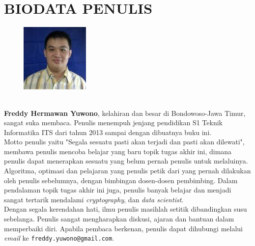 \chapter{BIODATA PENULIS}
		\begin{figure}
			\includegraphics[width=0.3\textwidth]{images/foto-diri.jpg}
		\end{figure}
		\textbf{\ \\Freddy Hermawan Yuwono}, kelahiran dan besar di Bondowoso-Jawa Timur, sangat suka membaca. Penulis menempuh jenjang pendidikan S1 Teknik Informatika ITS dari tahun 2013 sampai dengan dibuatnya buku ini.\\
		
		\indent Motto penulis yaitu "Segala sesuatu pasti akan terjadi dan pasti akan dilewati", membawa penulis mencoba belajar yang baru topik tugas akhir ini, dimana penulis dapat menerapkan sesuatu yang belum pernah penulis untuk melaluinya. Algoritma, optimasi dan pelajaran yang penulis petik dari yang pernah dilakukan oleh penulis sebelumnya, dengan bimbingan dosen-dosen pembimbing. Dalam pendalaman topik tugas akhir ini juga, penulis banyak belajar dan menjadi sangat tertarik mendalami \textit{cryptography}, dan \textit{data scientist}. \\
		\indent Dengan segala kerendahan hati, ilmu penulis masihlah setitik dibandingkan susu sebelanga. Penulis sangat mengharapkan diskusi, ajaran dan bantuan dalam memperbaiki diri. Apabila pembaca berkenan, penulis dapat dihubungi melalui \textit{email} ke \texttt{freddy.yuwono@gmail.com}.


